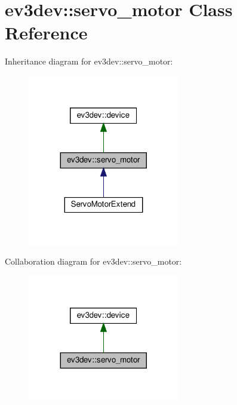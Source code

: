 \hypertarget{classev3dev_1_1servo__motor}{}\section{ev3dev\+:\+:servo\+\_\+motor Class Reference}
\label{classev3dev_1_1servo__motor}


Inheritance diagram for ev3dev\+:\+:servo\+\_\+motor\+:
\nopagebreak
\begin{figure}[H]
\begin{center}
\leavevmode
\includegraphics[width=188pt]{classev3dev_1_1servo__motor__inherit__graph}
\end{center}
\end{figure}


Collaboration diagram for ev3dev\+:\+:servo\+\_\+motor\+:
\nopagebreak
\begin{figure}[H]
\begin{center}
\leavevmode
\includegraphics[width=188pt]{classev3dev_1_1servo__motor__coll__graph}
\end{center}
\end{figure}
